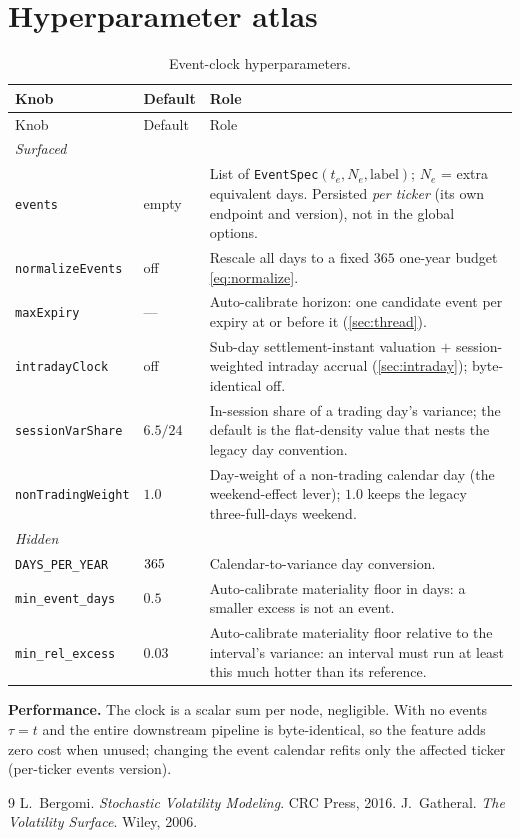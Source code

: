 \documentclass[11pt]{article}
\begin{document}
\appendix
\section{Hyperparameter atlas}
\label{app:atlas}

\begin{longtable}{p{}p{}p{}}
\caption{Event-clock hyperparameters.}\label{tab:atlas}\\
\toprule Knob & Default & Role\\ \midrule
\endfirsthead \toprule Knob & Default & Role\\ \midrule \endhead
\multicolumn{3}{l}{\emph{Surfaced}}\\ \midrule
\texttt{events} & empty & List of
\texttt{EventSpec}$(t_e,N_e,\text{label})$; $N_e$ = extra equivalent days.
Persisted \emph{per ticker} (its own endpoint and version), not in the
global options.\\
\texttt{normalizeEvents} & off & Rescale all days to a fixed $365$ one-year budget \eqref{eq:normalize}.\\
\texttt{maxExpiry} & --- & Auto-calibrate horizon: one candidate event per
expiry at or before it (\cref{sec:thread}).\\
\texttt{intradayClock} & off & Sub-day settlement-instant valuation $+$
session-weighted intraday accrual (\cref{sec:intraday}); byte-identical
off.\\
\texttt{sessionVarShare} & $6.5/24$ & In-session share of a trading day's
variance; the default is the flat-density value that nests the legacy day
convention.\\
\texttt{nonTradingWeight} & $1.0$ & Day-weight of a non-trading calendar day
(the weekend-effect lever); $1.0$ keeps the legacy three-full-days weekend.\\
\midrule
\multicolumn{3}{l}{\emph{Hidden}}\\ \midrule
\texttt{DAYS\_PER\_YEAR} & $365$ & Calendar-to-variance day conversion.\\
\texttt{min\_event\_days} & $0.5$ & Auto-calibrate materiality floor in
days: a smaller excess is not an event.\\
\texttt{min\_rel\_excess} & $0.03$ & Auto-calibrate materiality floor
relative to the interval's variance: an interval must run at least this much
hotter than its reference.\\
\bottomrule
\end{longtable}

\noindent\textbf{Performance.} The clock is a scalar sum per node, negligible.
With no events $\tau=t$ and the entire downstream pipeline is byte-identical, so
the feature adds zero cost when unused; changing the event calendar refits only the
affected ticker (per-ticker events version).

\begin{thebibliography}{9}
 L.~Bergomi. \emph{Stochastic Volatility Modeling}. CRC Press,
2016.
 J.~Gatheral. \emph{The Volatility Surface}. Wiley, 2006.
\end{thebibliography}
\end{document}

